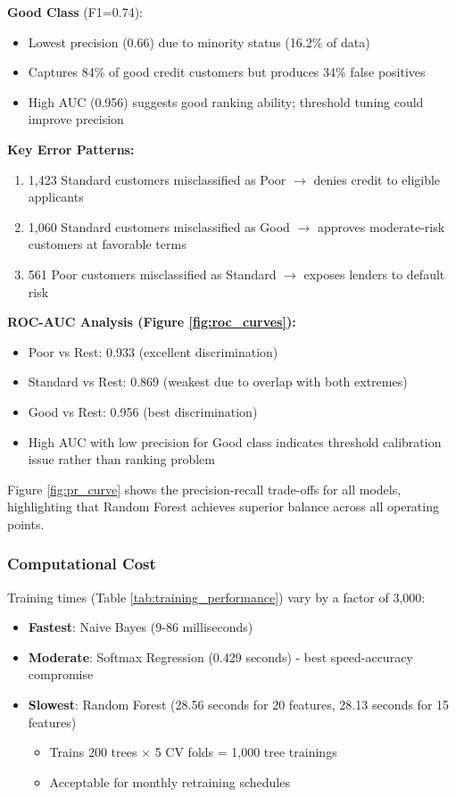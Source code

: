 \documentclass[11pt, a4paper]{article}
\begin{document}
\textbf{Good Class} (F1=0.74):
\begin{itemize}
    \item Lowest precision (0.66) due to minority status (16.2\% of data)
    \item Captures 84\% of good credit customers but produces 34\% false positives
    \item High AUC (0.956) suggests good ranking ability; threshold tuning could improve precision
\end{itemize}

\textbf{Key Error Patterns:}
\begin{enumerate}
    \item 1,423 Standard customers misclassified as Poor $\rightarrow$ denies credit to eligible applicants
    \item 1,060 Standard customers misclassified as Good $\rightarrow$ approves moderate-risk customers at favorable terms
    \item 561 Poor customers misclassified as Standard $\rightarrow$ exposes lenders to default risk
\end{enumerate}

\textbf{ROC-AUC Analysis (Figure \ref{fig:roc_curves}):}
\begin{itemize}
    \item Poor vs Rest: 0.933 (excellent discrimination)
    \item Standard vs Rest: 0.869 (weakest due to overlap with both extremes)
    \item Good vs Rest: 0.956 (best discrimination)
    \item High AUC with low precision for Good class indicates threshold calibration issue rather than ranking problem
\end{itemize}

Figure \ref{fig:pr_curve} shows the precision-recall trade-offs for all models, highlighting that Random Forest achieves superior balance across all operating points.

\subsubsection{Computational Cost}

Training times (Table \ref{tab:training_performance}) vary by a factor of 3,000:

\begin{itemize}
    \item \textbf{Fastest}: Naive Bayes (9-86 milliseconds)
    \item \textbf{Moderate}: Softmax Regression (0.429 seconds) - best speed-accuracy compromise
    \item \textbf{Slowest}: Random Forest (28.56 seconds for 20 features, 28.13 seconds for 15 features)
    \begin{itemize}
        \item Trains 200 trees $\times$ 5 CV folds = 1,000 tree trainings
        \item Acceptable for monthly retraining schedules
    \end{itemize}
\end{itemize}
\end{document}

